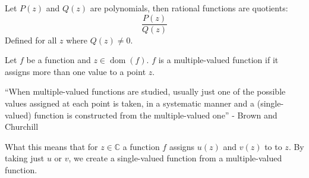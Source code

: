 \documentclass[12pt, english]{book}
\begin{document}
	\begin{definition} 
		\label{Rational Functions Definition - Complex}
		Let $P(z)$ and $Q(z)$ are polynomials, then rational functions are quotients:
		$$\frac{P(z)}{Q(z)}$$
		Defined for all $z$ where $Q(z) \neq 0$.
	\end{definition}
	
	\begin{definition} 
		\label{Multiple-Valued Function Definition - Complex}
		Let $f$ be a function and $z \in \operatorname{dom}(f)$. $f$ is a multiple-valued function if it assigns more than one value to a point $z$.
	\end{definition}
	``When multiple-valued functions are studied, usually just one of the possible values assigned at each point is taken, in a systematic manner and a (single-valued) function is constructed from the multiple-valued one'' - Brown and Churchill \cite{Brown.J;Churchill.R-Complex-Variables-2014}
	
	What this means that for $z \in \mathbb{C}$ a function $f$ assigns $u(z)$ and $v(z)$ to to $z$. By taking just $u$ or $v$, we create a single-valued function from a multiple-valued function. 
	
\end{document}
